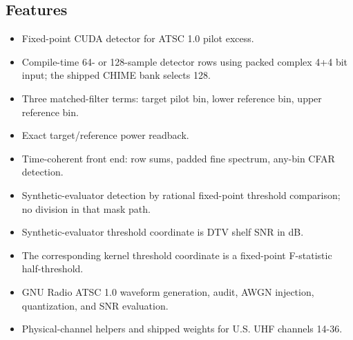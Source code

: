 \documentclass[10pt,letterpaper]{article}
\newcommand{\code}[1]{\texttt{\detokenize{#1}}}
\begin{document}
\begin{minipage}[t]{0.48\textwidth}
\subsection*{Features}
\begin{itemize}
  \item Fixed-point CUDA detector for ATSC 1.0 pilot excess.
  \item Compile-time 64- or 128-sample detector rows using packed complex
        4+4 bit input; the shipped CHIME bank selects 128.
  \item Three matched-filter terms: target pilot bin, lower reference bin, upper reference bin.
  \item Exact \code{uint64} target/reference power readback.
  \item Time-coherent front end: \code{int32} row sums, padded fine
        spectrum, any-bin CFAR detection.
  \item Synthetic-evaluator detection by rational fixed-point threshold comparison; no division in that mask path.
  \item Synthetic-evaluator threshold coordinate is DTV shelf SNR in dB.
  \item The corresponding kernel threshold coordinate is a fixed-point F-statistic half-threshold.
  \item GNU Radio ATSC 1.0 waveform generation, audit, AWGN injection, quantization, and SNR evaluation.
  \item Physical-channel helpers and shipped weights for U.S. UHF channels 14-36.
\end{itemize}
\end{minipage}
\hfill
\end{document}
